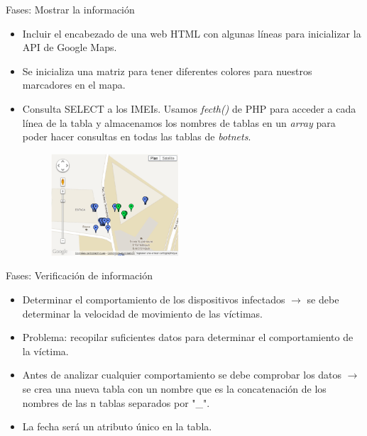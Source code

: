 \documentclass[aspectratio=43]{beamer}
\begin{document}
\begin{frame}{Fases: Mostrar la información}

\begin{itemize}

\item Incluir el encabezado de una web HTML con algunas líneas para inicializar la API de Google Maps.

\item Se inicializa una matriz para tener diferentes colores para nuestros marcadores en el mapa.

\item Consulta SELECT a los IMEIs. Usamos \emph{fecth()} de PHP para acceder a cada línea de la tabla y almacenamos los nombres de tablas en un \emph{array} para poder hacer consultas en todas las tablas de \emph{botnets}.


	\begin{figure}[htbp] 
	\begin{flushright} 
   \includegraphics[width=0.45\textwidth]{figuras/maps}  
  \label{maps}
  \end{flushright}
\end{figure}


\end{itemize}
  
\end{frame}

\begin{frame}{Fases: Verificación de información}

\begin{itemize}
\item Determinar el comportamiento de los dispositivos infectados $\rightarrow$ se debe determinar la velocidad de movimiento de las víctimas.

\item Problema: recopilar suficientes datos para determinar el comportamiento de la víctima.

\item Antes de analizar cualquier comportamiento se debe comprobar los datos $\rightarrow$ se crea una nueva tabla con un nombre que es la concatenación de los nombres de las n tablas separados por "\_". 

\item La fecha será un atributo único en la tabla.


\end{itemize}
  
\end{frame}
\end{document}
